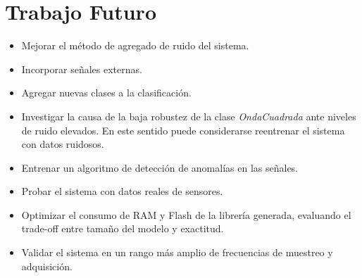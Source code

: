 \documentclass[a4paper,11pt]{article}
\begin{document}
\section{Trabajo Futuro}

\begin{itemize}
\item Mejorar el método de agregado de ruido del sistema.
\item Incorporar señales externas.
\item Agregar nuevas clases a la clasificación.
\item Investigar la causa de la baja robustez de la clase \textit{OndaCuadrada} ante niveles de ruido elevados. En este sentido puede considerarse reentrenar el sistema con datos ruidosos.
\item Entrenar un algoritmo de detección de anomalías en las señales.
\item Probar el sistema con datos reales de sensores.
\item Optimizar el consumo de RAM y Flash de la librería generada, evaluando el trade-off entre tamaño del modelo y exactitud.
\item Validar el sistema en un rango más amplio de frecuencias de muestreo y adquisición.
\end{itemize}
\end{document}
